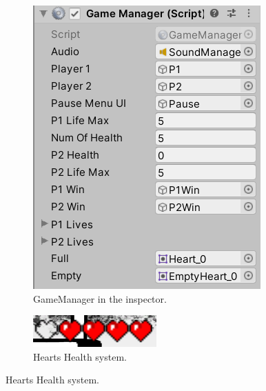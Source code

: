 \begin{figure}
\begin{subfigure}{.4\textwidth}
\centering
  \includegraphics[width= 1\linewidth]{Images/GameManagerInspect.PNG}
  \caption{GameManager in the inspector.}
  \label{fig:GameManager}
  \end{subfigure}
  \begin{subfigure}{.5\textwidth}
\centering
  \includegraphics[width= 1\linewidth]{Images/Hearts.PNG}
  \caption{Hearts Health system.}
  \label{fig:Hearts}
  \end{subfigure}
\end{figure}
\newpage

